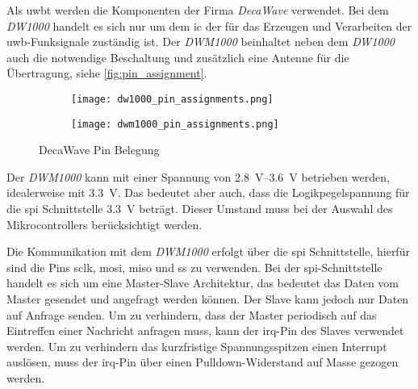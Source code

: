 \subsubsection{}\label{subsec:uwb_transceiver}

Als \Gls{uwbt} werden die Komponenten der Firma \textit{DecaWave} verwendet. Bei dem \textit{DW1000} handelt es sich nur um dem \Gls{ic} der für das Erzeugen und Verarbeiten der \gls{uwb}-Funksignale zuständig ist. Der \textit{DWM1000} beinhaltet neben dem \textit{DW1000} auch die notwendige Beschaltung und zusätzlich eine Antenne für die Übertragung, siehe \autoref{fig:pin_assignment}.

\begin{figure}
	\begin{subfigure}[t]{0.4\textwidth}
		\texttt{[image: dw1000\_pin\_assignments.png]}
		\label{fig:dw1000_pin_assignments}
	\end{subfigure}
	\hfill
	\begin{subfigure}[t]{0.4\textwidth}
		\texttt{[image: dwm1000\_pin\_assignments.png]}
		\label{fig:dwm1000_pin_assignments}
	\end{subfigure}
	\caption{DecaWave  Pin Belegung}
	\label{fig:pin_assignment}
\end{figure}

Der \textit{DWM1000} kann mit einer Spannung von \SIrange{2.8}{3.6}{\volt} \cite{decawave2016dwm1kdatasheet} betrieben werden, idealerweise mit \SI{3.3}{\volt}. Das bedeutet aber auch, dass die Logikpegelspannung für die \gls{spi} Schnittstelle \SI{3.3}{\volt} beträgt. Dieser Umstand muss bei der Auswahl des Mikrocontrollers berücksichtigt werden.

Die Kommunikation mit dem \textit{DWM1000} erfolgt über die \gls{spi} Schnittstelle, hierfür sind die Pins \gls{sclk}, \gls{mosi}, \gls{miso} und \gls{ss} zu verwenden. \cite{decawave2016dwm1kdatasheet} Bei der \gls{spi}-Schnittstelle handelt es sich um eine Master-Slave Architektur, das bedeutet das Daten vom Master gesendet und angefragt werden können. Der Slave kann jedoch nur Daten auf Anfrage senden. Um zu verhindern, dass der Master periodisch auf das Eintreffen einer Nachricht anfragen muss, kann der \gls{irq}-Pin des Slaves verwendet werden. Um zu verhindern das kurzfristige Spannungsspitzen einen Interrupt auslösen, muss der \gls{irq}-Pin über einen Pulldown-Widerstand auf Masse gezogen werden.

